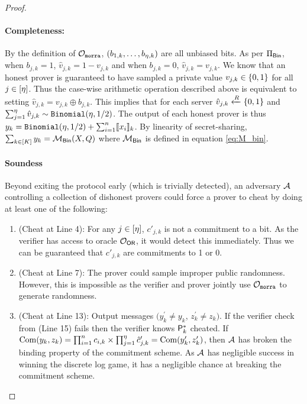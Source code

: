\begin{proof}
\

\paragraph{\textbf{Completeness:}}
By the definition of $\mathcal{O}_{\mathtt{morra}}$, $(b_{1,k}, \dots, b_{\eta,k})$ are all unbiased bits. 
As per $\Pi_{\mathsf{Bin}}$, when $b_{j,k}=1$, $\hat{v}_{j,k}=1-v_{j,k}$ and when $b_{j,k}=0$, $\hat{v}_{j,k} = v_{j,k}$. 
We know that an honest prover is guaranteed to have sampled a private value $v_{j,k} \in \{ 0, 1\}$ for all $j \in [\eta]$. 
Thus the case-wise arithmetic operation described above is equivalent to setting $\hat{v}_{j,k} = v_{j,k} \oplus b_{j,k}$. 
This implies that for each server $\hat{v}_{j,k} \xleftarrow{R} \{ 0, 1\}$ and $\sum_{j=1}^{\eta} \hat{v}_{j,k} \sim \texttt{Binomial}(\eta, 1/2)$. 
The output of each honest prover is thus $y_k = \texttt{Binomial}(\eta, 1/2) + \sum_{i=1}^n \llbracket x_i \rrbracket_k$. 
By linearity of secret-sharing, $\sum_{k \in [K]} y_k = \mathcal{M}_{\mathsf{Bin}}(X, Q)$ where  $\mathcal{M}_{\mathsf{Bin}}$ is defined in equation \eqref{eq:M_bin}. 

\paragraph{\textbf{Soundess}}
Beyond exiting the protocol early (which is trivially detected), an adversary $\mathcal{A}$ controlling a collection of dishonest provers could force a prover to cheat by doing at least one of the following:

\begin{enumerate}

    \item{ (Cheat at Line 4): For any $j \in [\eta]$, $c'_{j,k}$ is not a commitment to a bit. As the verifier has access to oracle $\mathcal{O}_{\mathsf{OR}}$, it would detect this immediately. Thus we can be guaranteed that $c'_{j,k}$ are commitments to 1 or 0.}

    \item{(Cheat at Line 7): The prover could sample improper public randomness. 
    However, this is impossible as the verifier and prover jointly use $\mathcal{O}_{\mathtt{morra}}$ to generate randomness.}
    
    \item{(Cheat at Line 13): Output messages $(y_k^\prime \neq y_k$, $z_{k}^\prime \neq z_{k})$. 
    If the verifier check from (Line 15) fails then the verifier knows $\mathsf{P}_k^*$ cheated. If 
      $\operatorname{Com}(y_k, z_{k}) = \prod_{i=1}^{n} c_{i, k}\times \prod_{j=1}^{\eta} \hat{c}'_{j,k} = \operatorname{Com}(y_k^\prime, z_{k}^\prime)$, then $\mathcal{A}$ has broken the binding property of the commitment scheme. As $\mathcal{A}$ has negligible success in winning the discrete log game, it has a negligible chance at breaking the commitment scheme. 
    }
\end{enumerate}


\end{proof}

